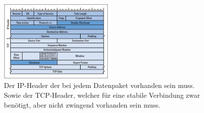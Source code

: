 \documentclass{article} %
\begin{document}
\begin{figure}[h]
\begin{center}
\includegraphics[width=0.5\textwidth]{data/grafik1.png}
\caption{Der IP-Header der bei jedem Datenpaket vorhanden sein muss. Sowie der TCP-Header, welcher für eine stabile Verbindung zwar benötigt, aber nicht zwingend vorhanden sein muss. \cite{tcpipstack}}
\label{Abbildung1}
\end{center}
\end{figure}


\newpage
\end{document}

